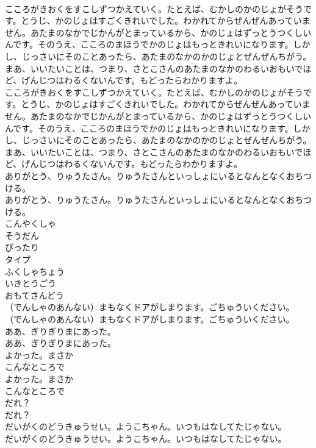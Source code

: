 \documentclass[8pt]{extreport}
\begin{document}
\begin{CJK}{UTF8}{min}
\\	こころがきおくをすこしずつかえていく。たとえば、むかしのかのじょがそうです。とうじ、かのじょはすごくきれいでした。わかれてからぜんぜんあっていません。あたまのなかでじかんがとまっているから、かのじょはずっとうつくしいんです。そのうえ、こころのまほうでかのじょはもっときれいになります。しかし、じっさいにそのことあったら、あたまのなかのかのじょとぜんぜんちがう。まあ、いいたいことは、つまり、さとこさんのあたまのなかのわるいおもいでほど、げんじつはわるくないんです。もどったらわかりますよ。
\\	こころがきおくをすこしずつかえていく。たとえば、むかしのかのじょがそうです。とうじ、かのじょはすごくきれいでした。わかれてからぜんぜんあっていません。あたまのなかでじかんがとまっているから、かのじょはずっとうつくしいんです。そのうえ、こころのまほうでかのじょはもっときれいになります。しかし、じっさいにそのことあったら、あたまのなかのかのじょとぜんぜんちがう。まあ、いいたいことは、つまり、さとこさんのあたまのなかのわるいおもいでほど、げんじつはわるくないんです。もどったらわかりますよ。
\\	ありがとう、りゅうたさん。りゅうたさんといっしょにいるとなんとなくおちつける。
\\	ありがとう、りゅうたさん。りゅうたさんといっしょにいるとなんとなくおちつける。
\\	こんやくしゃ
\\	そうだん
\\	ぴったり
\\	タイプ
\\	ふくしゃちょう
\\	いきとうごう
\\	おもてさんどう
\\	（でんしゃのあんない）まもなくドアがしまります。ごちゅういください。
\\	（でんしゃのあんない）まもなくドアがしまります。ごちゅういください。
\\	ああ、ぎりぎりまにあった。
\\	ああ、ぎりぎりまにあった。
\\	よかった。まさか
\\	こんなところで
\\	よかった。まさか
\\	こんなところで
\\	だれ？
\\	だれ？
\\	だいがくのどうきゅうせい。ようこちゃん。いつもはなしてたじゃない。
\\	だいがくのどうきゅうせい。ようこちゃん。いつもはなしてたじゃない。

\end{CJK}
\end{document}
